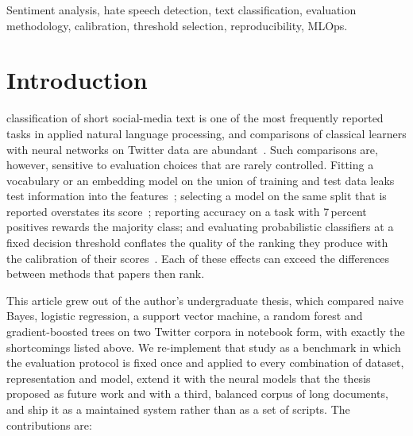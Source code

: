 \documentclass[journal,10pt]{IEEEtran}
\begin{document}
\begin{IEEEkeywords}
Sentiment analysis, hate speech detection, text classification, evaluation methodology, calibration, threshold selection, reproducibility, MLOps.
\end{IEEEkeywords}

\section{Introduction}
 classification of short social-media text is one of the most frequently reported tasks in applied natural language processing, and comparisons of classical learners with neural networks on Twitter data are abundant~\cite{pang2008,liu2012}. Such comparisons are, however, sensitive to evaluation choices that are rarely controlled. Fitting a vocabulary or an embedding model on the union of training and test data leaks test information into the features~\cite{kaufman2012}; selecting a model on the same split that is reported overstates its score~\cite{cawley2010}; reporting accuracy on a task with 7\,percent positives rewards the majority class; and evaluating probabilistic classifiers at a fixed decision threshold conflates the quality of the ranking they produce with the calibration of their scores~\cite{lipton2014,guo2017}. Each of these effects can exceed the differences between methods that papers then rank.

This article grew out of the author's undergraduate thesis, which compared naive Bayes, logistic regression, a support vector machine, a random forest and gradient-boosted trees on two Twitter corpora in notebook form, with exactly the shortcomings listed above. We re-implement that study as a benchmark in which the evaluation protocol is fixed once and applied to every combination of dataset, representation and model, extend it with the neural models that the thesis proposed as future work and with a third, balanced corpus of long documents, and ship it as a maintained system rather than as a set of scripts. The contributions are:
\end{document}
